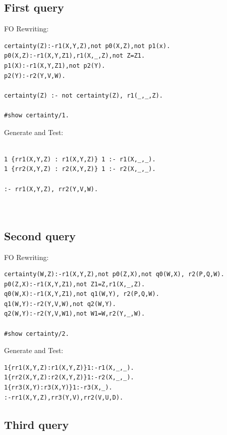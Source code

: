 \documentclass[acmsmall]{acmart}
\begin{document}
\begin{CCSXML}
\subsection{First query}

FO Rewriting:
\begin{lstlisting}
certainty(Z):-r1(X,Y,Z),not p0(X,Z),not p1(x).
p0(X,Z):-r1(X,Y,Z1),r1(X,_,Z),not Z=Z1.
p1(X):-r1(X,Y,Z1),not p2(Y).
p2(Y):-r2(Y,V,W).

certainty(Z) :- not certainty(Z), r1(_,_,Z).

#show certainty/1.

\end{lstlisting}

Generate and Test:
\begin{lstlisting}

1 {rr1(X,Y,Z) : r1(X,Y,Z)} 1 :- r1(X,_,_).
1 {rr2(X,Y,Z) : r2(X,Y,Z)} 1 :- r2(X,_,_).

:- rr1(X,Y,Z), rr2(Y,V,W).



\end{lstlisting}



\subsection{Second query}


FO Rewriting:
\begin{lstlisting}
certainty(W,Z):-r1(X,Y,Z),not p0(Z,X),not q0(W,X), r2(P,Q,W).
p0(Z,X):-r1(X,Y,Z1),not Z1=Z,r1(X,_,Z).
q0(W,X):-r1(X,Y,Z1),not q1(W,Y), r2(P,Q,W).
q1(W,Y):-r2(Y,V,W),not q2(W,Y).
q2(W,Y):-r2(Y,V,W1),not W1=W,r2(Y,_,W).

#show certainty/2.
\end{lstlisting}

Generate and Test:
\begin{lstlisting}
1{rr1(X,Y,Z):r1(X,Y,Z)}1:-r1(X,_,_).
1{rr2(X,Y,Z):r2(X,Y,Z)}1:-r2(X,_,_).
1{rr3(X,Y):r3(X,Y)}1:-r3(X,_).
:-rr1(X,Y,Z),rr3(Y,V),rr2(V,U,D).

\end{lstlisting}


\subsection{Third query}


\end{CCSXML}
\end{document}
